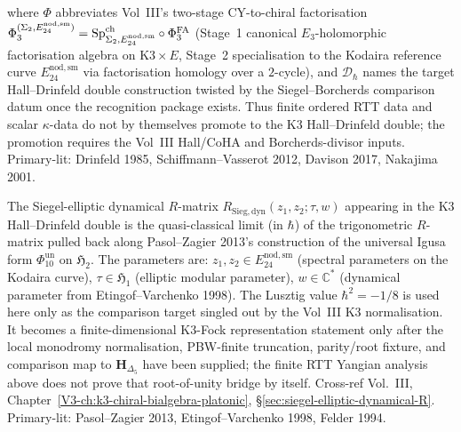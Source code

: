\begin{remark}
\[\]
where $\Phi$ abbreviates Vol~III's two-stage CY-to-chiral factorisation
$\Phi_3^{(\Sigma_2,E^{\mathrm{nod,sm}}_{24})}
= \mathrm{Sp}^{\mathrm{ch}}_{\Sigma_2, E^{\mathrm{nod,sm}}_{24}} \circ \Phi^{\mathrm{FA}}_3$
(Stage~1 canonical $E_3$-holomorphic factorisation algebra on
$\mathrm{K3} \times E$, Stage~2 specialisation to the Kodaira
reference curve $E^{\mathrm{nod,sm}}_{24}$ via factorisation
homology over a $2$-cycle), and $\mathcal D_\hbar$ names the
target Hall--Drinfeld double construction twisted by the
Siegel--Borcherds comparison datum once the recognition package
exists.
Thus finite ordered RTT data and scalar $\kappa$-data do not by
themselves promote to the K3 Hall--Drinfeld double; the promotion
requires the Vol~III Hall/CoHA and Borcherds-divisor inputs.
Primary-lit: Drinfeld 1985, Schiffmann--Vasserot 2012, Davison 2017,
Nakajima 2001.
\end{remark}

\begin{remark}
\label{rem:yangfnd-2}
The Siegel-elliptic dynamical $R$-matrix $R_{\mathrm{Sieg,dyn}}(z_1,z_2;\tau,w)$
appearing in the K3 Hall--Drinfeld double is the quasi-classical limit
(in $\hbar$) of the trigonometric $R$-matrix pulled back along
Pasol--Zagier 2013's construction of the universal Igusa form
$\Phi_{10}^{\mathrm{un}}$ on $\mathfrak H_2$. The parameters are: $z_1,z_2\in E^{\mathrm{nod,sm}}_{24}$
(spectral parameters on the Kodaira curve), $\tau\in\mathfrak H_1$
(elliptic modular parameter), $w\in\mathbb C^*$ (dynamical parameter
from Etingof--Varchenko 1998). The Lusztig value
$\hbar^2=-1/8$ is used here only as the comparison target singled out
by the Vol~III K3 normalisation.  It becomes a finite-dimensional
K3-Fock representation statement only after the local monodromy
normalisation, PBW-finite truncation, parity/root fixture, and
comparison map to $\mathbf H_{\Delta_5}$ have been supplied; the
finite RTT Yangian analysis above does not prove that root-of-unity
bridge by itself. Cross-ref Vol.~III,
Chapter~\ref{V3-ch:k3-chiral-bialgebra-platonic},
\S\ref{sec:siegel-elliptic-dynamical-R}. Primary-lit: Pasol--Zagier 2013,
Etingof--Varchenko 1998, Felder 1994.
\end{remark}
